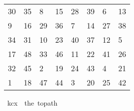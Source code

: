 \begin{isabellebody}
\begin{isamarkuptext}
  \begin{table}[H]
    \begin{tabular}{llllllll}
      30 & 35 &  8 & 15 & 28 & 39 &  6 & 13 \\
       9 & 16 & 29 & 36 &  7 & 14 & 27 & 38 \\
      34 & 31 & 10 & 23 & 40 & 37 & 12 &  5 \\
      17 & 48 & 33 & 46 & 11 & 22 & 41 & 26 \\
      32 & 45 &  2 & 19 & 24 & 43 &  4 & 21 \\
       1 & 18 & 47 & 44 &  3 & 20 & 25 & 42
    \end{tabular}
  \end{table}%
\end{isamarkuptext}\isamarkuptrue%
\isamarkupfalse%
\ {\isachardoublequoteopen}kc{}x{}\ {\isasymequiv}\ the\ {\isacharparenleft}{\kern0pt}to{\isacharunderscore}{\kern0pt}path\ \isanewline
\ \ {\isacharbrackleft}{\kern0pt}{\isacharbrackleft}{\kern0pt}{}{}{\isacharcomma}{\kern0pt}{}{}{\isacharcomma}{\kern0pt}{}{\isacharcomma}{\kern0pt}{}{}{\isacharcomma}{\kern0pt}{}{}{\isacharcomma}{\kern0pt}{}{}{\isacharcomma}{\kern0pt}{}{\isacharcomma}{\kern0pt}{}{}{\isacharbrackright}{\kern0pt}{\isacharcomma}{\kern0pt}\isanewline
\ \ {\isacharbrackleft}{\kern0pt}{}{\isacharcomma}{\kern0pt}{}{}{\isacharcomma}{\kern0pt}{}{}{\isacharcomma}{\kern0pt}{}{}{\isacharcomma}{\kern0pt}{}{\isacharcomma}{\kern0pt}{}{}{\isacharcomma}{\kern0pt}{}{}{\isacharcomma}{\kern0pt}{}{}{\isacharbrackright}{\kern0pt}{\isacharcomma}{\kern0pt}\isanewline
\ \ {\isacharbrackleft}{\kern0pt}{}{}{\isacharcomma}{\kern0pt}{}{}{\isacharcomma}{\kern0pt}{}{}{\isacharcomma}{\kern0pt}{}{}{\isacharcomma}{\kern0pt}{}{}{\isacharcomma}{\kern0pt}{}{}{\isacharcomma}{\kern0pt}{}{}{\isacharcomma}{\kern0pt}{}{\isacharbrackright}{\kern0pt}{\isacharcomma}{\kern0pt}\isanewline
\ \ {\isacharbrackleft}{\kern0pt}{}{}{\isacharcomma}{\kern0pt}{}{}{\isacharcomma}{\kern0pt}{}{}{\isacharcomma}{\kern0pt}{}{}{\isacharcomma}{\kern0pt}{}{}{\isacharcomma}{\kern0pt}{}{}{\isacharcomma}{\kern0pt}{}{}{\isacharcomma}{\kern0pt}{}{}{\isacharbrackright}{\kern0pt}{\isacharcomma}{\kern0pt}\isanewline

\end{isabellebody}
